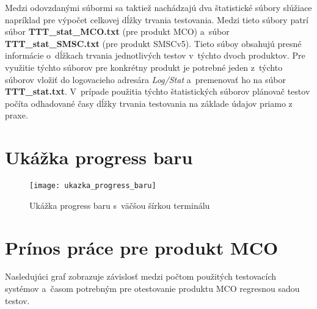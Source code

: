 Medzi odovzdanými súbormi sa taktiež nachádzajú dva štatistické súbory 
slúžiace napríklad pre výpočet celkovej dĺžky trvania testovania. 
Medzi tieto súbory patrí súbor \textbf{TTT\_stat\_MCO.txt} (pre produkt MCO) 
a~súbor \textbf{TTT\_stat\_SMSC.txt} (pre produkt SMSCv5).
Tieto súboy obsahujú presné informácie o~dĺžkach trvania jednotlivých 
testov v~týchto dvoch produktov. 
Pre využitie týchto súborov pre konkrétny produkt je potrebné jeden 
z~týchto súborov vložiť do logovacieho adresára \textit{Log/Stat} 
a~premenovať ho na súbor \textbf{TTT\_stat.txt}.
V~prípade použitia týchto štatistických súborov plánovač testov počíta
odhadované časy dĺžky trvania testovania na základe údajov priamo z praxe.



%
%
\chapter{Ukážka progress baru}
\label{priloha:ukazka_progress_baru}
\begin{figure}[h]
  \begin{center}
    \texttt{[image: ukazka\_progress\_baru]} 
    \caption{Ukážka progress baru s~väčšou šírkou terminálu}
  \end{center}
\end{figure}



%
%
\chapter{Prínos práce pre produkt MCO}
\label{priloha:graf_mco}
Nasledujúci graf zobrazuje závislosť medzi počtom použitých testovacích
systémov a~časom potrebným pre otestovanie produktu MCO regresnou 
sadou testov.

\begin{figure}[h!]
\end{figure}



